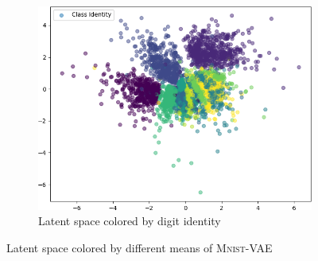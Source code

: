 \begin{figure}
    \hfill
    \begin{subfigure}{.24\textwidth}
        \includegraphics[width=\textwidth]{images/latent_spaces/mnist/vae/embeddings_mu_6.png}
        \caption{Latent space colored by digit identity}
        \label{subfig:vae_mnist_latent_space_identity}
    \end{subfigure}
    \caption[\textsc{Mnist}-VAE - Latent Space]{Latent space colored by different means of \textsc{Mnist}-\ac{VAE}}
    \label{fig:vae_latent_space_mnist}
\end{figure}

